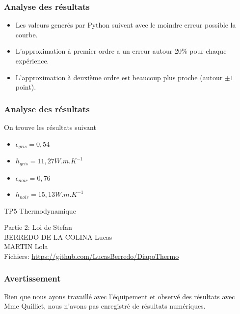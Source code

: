 \documentclass{beamer}
\begin{document}
\begin{frame}
\frametitle{Analyse des résultats}

\begin{itemize}
	\item{Les valeurs generés par Python suivent avec le moindre erreur possible la courbe.\newline}
	\item{L'approximation à premier ordre a un erreur autour 20\% pour chaque expérience.\newline}
	\item{L'approximation à deuxième ordre est beaucoup plus proche (autour $\pm1$ point).\newline}
\end{itemize}

\end{frame}


\begin{frame}
\frametitle{Analyse des résultats}
On trouve les résultats suivant
\begin{itemize}
	\item{$\epsilon_{gris}=0,54 $\newline}

	\item{$h_{gris}=11,27 W.m.K^{-1} $\newline}
    \item{$\epsilon_{noir}=0,76 $\newline}
    \item{$h_{noir}=15,13 W.m.K^{-1} $\newline}
\end{itemize}

\end{frame}




\begin{frame}
\vfill
\Huge{TP5 Thermodynamique}

\Large{Partie 2: Loi de Stefan}
\\[2em]
\large{BERREDO DE LA COLINA Lucas\\ MARTIN Lola}
\\[2em]
{\small Fichiers: \url{https://github.com/LucasBerredo/DiapoThermo}}

\end{frame}





\begin{frame}
\frametitle{Avertissement}
Bien que nous ayons travaillé avec l'équipement et observé des résultats avec Mme Quilliet, nous n'avons pas enregistré de résultats numériques.
\end{frame}
\end{document}
